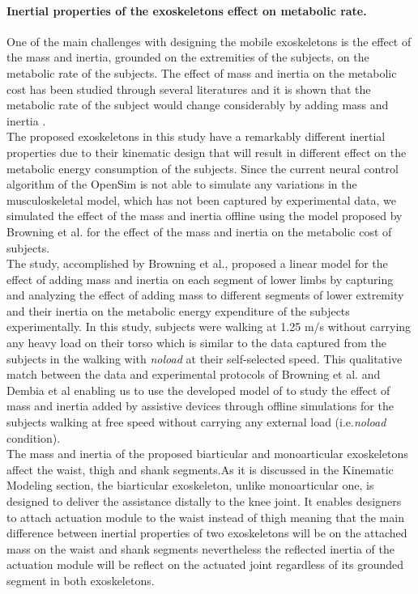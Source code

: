 \documentclass[10pt,letterpaper]{article}
\begin{document}
\paragraph*{Inertial properties of the exoskeletons effect on metabolic rate.} 
One of the main challenges with designing the mobile exoskeletons is the effect of the mass and inertia, grounded on the extremities of the subjects, on the metabolic rate of the subjects. The effect of mass and inertia on the metabolic cost has been studied through several literatures \cite{133,134} and it is shown that the metabolic rate of the subject would change considerably by adding mass and inertia \cite{133,134,135}.\\
The proposed exoskeletons in this study have a remarkably different inertial properties due to their kinematic design that will result in different effect on the metabolic energy consumption of the subjects. Since the current neural control algorithm of the OpenSim is not able to simulate any variations in the musculoskeletal model\cite{92}, which has not been captured by experimental data, we simulated the effect of the mass and inertia offline using the model proposed by Browning et al.\cite{133} for the effect of the mass and inertia on the metabolic cost of subjects.\\
The study, accomplished by Browning et al.\cite{133}, proposed a linear model for the effect of adding mass and inertia on each segment of lower limbs by capturing and analyzing the effect of adding mass to different segments of lower extremity and their inertia on the metabolic energy expenditure of the subjects experimentally. In this study, subjects were walking at 1.25 m/s without carrying any heavy load on their torso which is similar to the data captured from the subjects in the walking with \textit{\textit{noload}} at their self-selected speed\cite{93}. This qualitative match between the data and experimental protocols of Browning et al. and Dembia et al enabling us to use the developed model of \cite{133}  to study the effect of mass and inertia added by assistive devices through offline simulations for the subjects walking at free speed without carrying any external load (i.e.{\it noload} condition).\\
The mass and inertia of the proposed biarticular and monoarticular exoskeletons affect the waist, thigh and shank segments.As it is discussed in the Kinematic Modeling section, the biarticular exoskeleton, unlike monoarticular one, is designed to deliver the assistance distally to the knee joint.
It enables designers to attach actuation module to the waist instead of thigh meaning that the main difference between inertial properties of two exoskeletons will be on the attached mass on the waist and shank segments nevertheless the reflected inertia of the actuation module will be reflect on the actuated joint regardless of its grounded segment in both exoskeletons.\\
\end{document}
